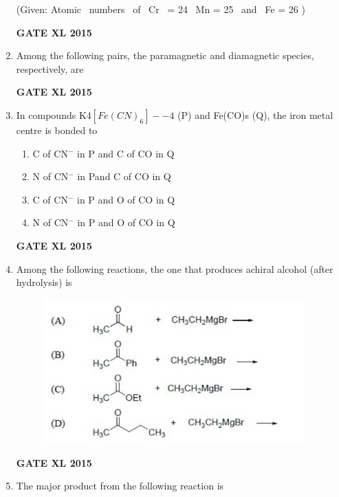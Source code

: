 \documentclass[journal,12pt,onecolumn]{IEEEtran}
\begin{document}
\begin{enumerate}
	(Given: Atomic \ numbers \ of \ Cr \ = 24 \ Mn = 25 \ and \ Fe = 26 )    \begin{enumerate}
    \end{enumerate}
\hfill{\textbf{GATE XL 2015}}
\item Among the following pairs, the paramagnetic and diamagnetic species, respectively, are
    \begin{enumerate}
    \end{enumerate}
\hfill{\textbf{GATE XL 2015}}
\item In compounds K4$[Fe(CN)_6]-{-4}$ (P) and Fe(CO)s (Q), the iron metal centre is bonded to
    \begin{enumerate}
            \item C of CN$^-$ in P and C of CO in Q
            \item N of CN$^-$ in Pand C of CO in Q
            \item C of CN$^-$ in P and O of CO in Q
            \item N of CN$^-$ in P and O of CO in Q
    \end{enumerate}
\hfill{\textbf{GATE XL 2015}}
\item  Among the following reactions, the one that produces achiral alcohol (after hydrolysis) is

	
	\begin{figure}[h!]
		\centering
    \includegraphics[width=10cm]{21}
		    \caption*{}
		\label{fig:Q21}
	\end{figure}
\hfill{\textbf{GATE XL 2015}}
\item The major product from the following reaction is
    

\end{enumerate}
\end{document}
